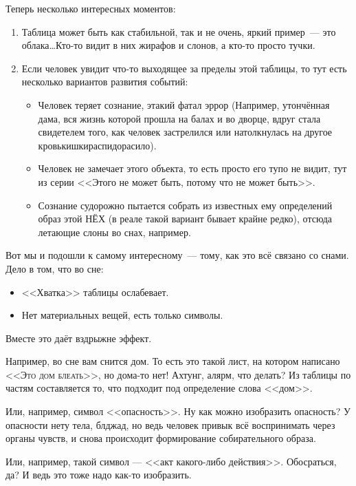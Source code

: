 \documentclass[a4paper,14pt,oneside]{memoir}
\begin{document}
Теперь несколько интересных моментов:
\begin{enumerate}
\item Таблица может быть как стабильной, так и не очень, яркий пример~--- это облака\ldots Кто-то видит в них жирафов и слонов, а кто-то просто тучки. 
\item Если человек увидит что-то выходящее за пределы этой таблицы, то тут есть несколько вариантов развития событий:
\begin{itemize}
\item Человек теряет сознание, этакий фатал эррор (Например, утончённая дама, вся жизнь которой прошла на балах и во дворце, вдруг стала свидетелем того, как человек застрелился или натолкнулась на другое кровькишкираспидорасило).
\item Человек не замечает этого объекта, то есть просто его тупо не видит, тут из серии <<Этого не может быть, потому что не может быть>>.
\item Сознание судорожно пытается собрать из известных ему определений образ этой НЁХ (в реале такой вариант бывает крайне редко), отсюда летающие слоны во снах, например.
\end{itemize}
\end{enumerate}

Вот мы и подошли к самому интересному~--- тому, как это всё связано со снами. Дело в том, что во сне:
\begin {itemize}
\item <<Хватка>> таблицы ослабевает. 
\item Нет материальных вещей, есть только символы.
\end{itemize}

Вместе это даёт вздрыжне эффект.
 
Например, во сне вам снится дом. То есть это такой лист, на котором написано <<\textsc{Это дом блеать}>>, но дома-то нет! Ахтунг, алярм, что делать? Из таблицы по частям составляется то, что подходит под определение слова <<дом>>. 

Или, например, символ <<опасность>>. Ну как можно изобразить опасность? У опасности нету тела, блджад, но ведь человек привык всё воспринимать через органы чувств, и снова происходит формирование собирательного образа. 

Или, например, такой символ — <<акт какого-либо действия>>. О\-бо\-срать\-ся, да? И ведь это тоже надо как-то изобразить. 
\end{document}
